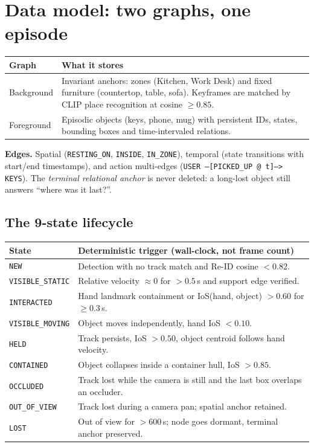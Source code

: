 \documentclass[10pt,a4paper]{article}
\newcommand{\code}[1]{\texttt{\small #1}}
\begin{document}
\section{Data model: two graphs, one episode}

\begin{tabularx}{\linewidth}{@{}lX@{}}
\toprule
\textbf{Graph} & \textbf{What it stores} \\
\midrule
Background & Invariant anchors: zones (Kitchen, Work Desk) and fixed furniture (countertop, table,
sofa). Keyframes are matched by CLIP place recognition at cosine $\geq 0.85$. \\
Foreground & Episodic objects (keys, phone, mug) with persistent IDs, states, bounding boxes and
time-intervaled relations. \\
\bottomrule
\end{tabularx}

\textbf{Edges.} Spatial (\code{RESTING\_ON}, \code{INSIDE}, \code{IN\_ZONE}), temporal
(state transitions with start/end timestamps), and action multi-edges
(\code{USER --[PICKED\_UP @ t]--> KEYS}). The \emph{terminal relational anchor} is never deleted:
a long-lost object still answers ``where was it last?''.

\subsection{The 9-state lifecycle}

\begin{tabularx}{\linewidth}{@{}lX@{}}
\toprule
\textbf{State} & \textbf{Deterministic trigger (wall-clock, not frame count)} \\
\midrule
\code{NEW} & Detection with no track match and Re-ID cosine $< 0.82$. \\
\code{VISIBLE\_STATIC} & Relative velocity $\approx 0$ for $>0.5$\,s and support edge verified. \\
\code{INTERACTED} & Hand landmark containment or IoS(hand, object) $>0.60$ for $\geq 0.3$\,s. \\
\code{VISIBLE\_MOVING} & Object moves independently, hand IoS $< 0.10$. \\
\code{HELD} & Track persists, IoS $>0.50$, object centroid follows hand velocity. \\
\code{CONTAINED} & Object collapses inside a container hull, IoS $>0.85$. \\
\code{OCCLUDED} & Track lost while the camera is still and the last box overlaps an occluder. \\
\code{OUT\_OF\_VIEW} & Track lost during a camera pan; spatial anchor retained. \\
\code{LOST} & Out of view for $>600$\,s; node goes dormant, terminal anchor preserved. \\
\bottomrule
\end{tabularx}
\end{document}
